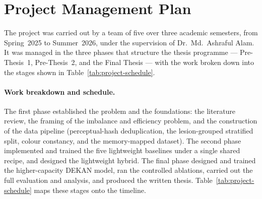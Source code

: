 \section{Project Management Plan}
\label{sec:project-management}

The project was carried out by a team of five over three academic semesters,
from Spring~2025 to Summer~2026, under the supervision of
Dr.\ Md.\ Ashraful Alam. It was managed in the three phases that structure the
thesis programme --- Pre-Thesis~1, Pre-Thesis~2, and the Final Thesis --- with
the work broken down into the stages shown in
Table~\ref{tab:project-schedule}.

\paragraph{Work breakdown and schedule.}
The first phase established the problem and the foundations: the literature
review, the framing of the imbalance and efficiency problem, and the
construction of the data pipeline (perceptual-hash deduplication, the
lesion-grouped stratified split, colour constancy, and the memory-mapped
dataset). The second phase implemented and trained the five lightweight
baselines under a single shared recipe, and designed the lightweight hybrid.
The final phase designed and trained the higher-capacity DEKAN model, ran the
controlled ablations, carried out the full evaluation and analysis, and
produced the written thesis. Table~\ref{tab:project-schedule} maps these
stages onto the timeline.

